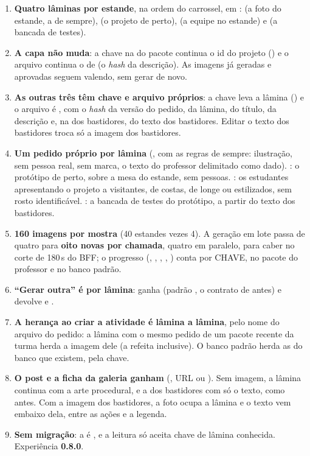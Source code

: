 \begin{enumerate}
  \item \textbf{Quatro lâminas por estande}, na ordem do carrossel, em
    :  (a foto do
    estande, a de sempre),  (o projeto de perto),  (a
    equipe no estande) e  (a bancada de testes).
  \item \textbf{A capa não muda}: a chave na  do pacote continua o
    id do projeto () e o arquivo continua o de 
    (o \emph{hash} da descrição). As imagens já geradas e aprovadas seguem
    valendo, sem gerar de novo.
  \item \textbf{As outras três têm chave e arquivo próprios}: a chave leva a
    lâmina () e o arquivo é
    , com o \emph{hash} da versão do pedido,
    da lâmina, do título, da descrição e, na dos bastidores, do texto dos
    bastidores. Editar o texto dos bastidores troca só a imagem dos
    bastidores.
  \item \textbf{Um pedido próprio por lâmina} (, com as
    regras de sempre: ilustração, sem pessoa real, sem marca, o texto do
    professor delimitado como dado). : o protótipo de perto,
    sobre a mesa do estande, sem pessoas. : os estudantes
    apresentando o projeto a visitantes, de costas, de longe ou estilizados,
    sem rosto identificável. : a bancada de testes do protótipo,
    a partir do texto dos bastidores.
  \item \textbf{160 imagens por mostra} (40 estandes vezes 4). A geração em
    lote passa de quatro para \textbf{oito novas por chamada}, quatro em
    paralelo, para caber no corte de 180\,s do BFF; o progresso
    (, , , , ) conta
    por CHAVE, no pacote do professor e no banco padrão.
  \item \textbf{\enquote{Gerar outra} é por lâmina}:
     ganha 
    (padrão , o contrato de antes) e devolve  e
    .
  \item \textbf{A herança ao criar a atividade é lâmina a lâmina}, pelo nome do
    arquivo do pedido: a lâmina com o mesmo pedido de um pacote recente da
    turma herda a imagem dele (a refeita inclusive). O banco padrão herda as
    do banco que existem, pela chave.
  \item \textbf{O post e a ficha da galeria ganham }
    (, URL ou ). Sem imagem, a
    lâmina continua com a arte procedural, e a dos bastidores com só o texto,
    como antes. Com a imagem dos bastidores, a foto ocupa a lâmina e o texto
    vem embaixo dela, entre as ações e a legenda.
  \item \textbf{Sem migração}: a  é , e a leitura só aceita
    chave de lâmina conhecida. Experiência \textbf{0.8.0}.
\end{enumerate}

